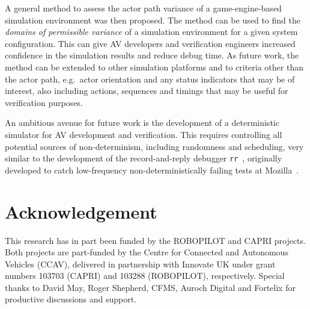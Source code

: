 A general method to assess the actor path variance of a game-engine-based simulation environment was then proposed. The method can be used to find the \textit{domains of permissible variance} of a simulation environment for a given system configuration. This can give AV developers and verification engineers increased confidence in the simulation results and reduce debug time. As future work, the method can be extended to other simulation platforms and to criteria other than the actor path, e.g.\ actor orientation and any status indicators that may be of interest, also including actions, sequences and timings that may be useful for verification purposes.

An ambitious avenue for future work is the development of a deterministic simulator for AV development and verification. This requires controlling all potential sources of non-determinism, including randomness and scheduling, very similar to the development of the record-and-reply debugger \texttt{rr}~\cite{RR_link}, originally developed to catch low-frequency non-deterministically failing tests at Mozilla~\cite{acm-q-rr-interview}.

\section*{Acknowledgement}
This research has in part been funded by the ROBOPILOT and CAPRI projects. Both projects are part-funded by the Centre for Connected and Autonomous Vehicles (CCAV), delivered in partnership with Innovate UK under grant numbers 103703 (CAPRI) and 103288 (ROBOPILOT), respectively. Special thanks to David May, Roger Shepherd, CFMS, Auroch Digital and Fortelix for productive discussions and support.
